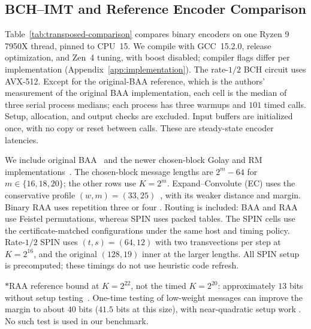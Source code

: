 \subsection{BCH--IMT and Reference Encoder Comparison}
\label{sec:transposed-comparison}
Table~\ref{tab:transposed-comparison} compares binary encoders on one
Ryzen 9 7950X thread, pinned to CPU~15.
We compile with GCC~15.2.0, release optimization, and Zen~4 tuning,
with boost disabled; compiler flags differ per implementation
(Appendix~\ref{app:implementation}). The rate-$1/2$ BCH circuit uses AVX-512.
Except for the original-BAA reference, which is the authors' measurement
of the original BAA implementation, each cell is the median of three
serial process medians; each process has three warmups and $101$ timed calls.
Setup, allocation, and output checks are excluded. Input buffers are
initialized once, with no copy or reset between calls. These are
steady-state encoder latencies.

We include original BAA~\cite{KolesnikovEtAl2026BA} and the newer
chosen-block Golay and RM implementations~\cite{cryptoeprint:2026/1903}.
The chosen-block message lengths are $2^m-64$ for
$m\in\{16,18,20\}$; the other rows use $K=2^m$.
Expand--Convolute (EC) uses the conservative profile
$(w,m)=(33,25)$~\cite{RaghuramanRindalTanguy2023EC}, with its weaker
distance and margin. Binary RAA uses repetition three or four
\cite{blaze25}. Routing is included: BAA and RAA use Feistel permutations,
whereas SPIN uses packed tables. The SPIN cells use the certificate-matched
configurations under the same host and timing policy.
Rate-$1/2$ SPIN uses $(t,s)=(64,12)$ with two transvections per step at
$K=2^{16}$, and the original $(128,19)$ inner at the larger lengths.
All SPIN setup is precomputed; these timings do not use heuristic code refresh.

\begin{table}[tb]
\centering
\caption{Same-host transposed-encoder latency in milliseconds.
Entries are medians of three process medians, with no input resets,
except for the approximate original-BAA reference.
The pair $(\delta,\lambda)$ gives the relative distance and margin
in bits at the largest listed length, except for the RAA reference marked
$*$ below; -- denotes no bound or no timing reported.
EC uses the conservative, weaker distance and margin target.}
\label{tab:transposed-comparison}
\small
\setlength{\tabcolsep}{3pt}

\par\smallskip
\begin{minipage}{\linewidth}
\footnotesize
$*$RAA reference bound at $K=2^{22}$, not the timed $K=2^{20}$:
approximately $13$ bits without setup testing~\cite[Sec.~3.1]{blaze25}.
One-time testing of low-weight messages can improve the margin to about
$40$ bits ($41.5$ bits at this size), with near-quadratic setup work
\cite[Fig.~2]{blaze25}. No such test is used in our benchmark.
\end{minipage}
\end{table}

